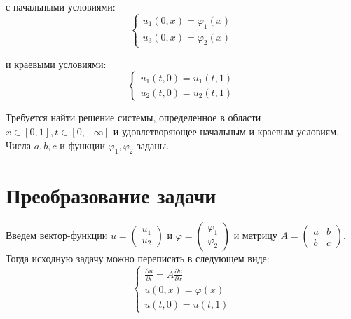 \documentclass[titlepage]{article}
\def\l{\left}
\def\r{\right}
\def\part{\partial}
\begin{document}
с начальными условиями:
\begin{equation*}
 \begin{cases}
 	u_1(0,x) = \varphi_1(x)
   \\
 	u_3(0,x) = \varphi_2(x)	
 \end{cases}
\end{equation*}

и краевыми условиями:
\begin{equation*}
 \begin{cases}
 	u_1(t,0) = u_1(t,1)
   \\
 	u_2(t,0) = u_2(t,1)
 \end{cases}
\end{equation*}

Требуется найти решение системы, определенное в области $x \in [0,1], t \in [0,+\infty]$ и удовлетворяющее начальным и краевым условиям.
Числа $a, b, c$ и функции $\varphi_1, \varphi_2$ заданы.

\section{Преобразование задачи}
Введем вектор-функции $u = \l(\begin{matrix} u_1 \\ u_2 \end{matrix}\r)$ и $\varphi = \l(\begin{matrix} \varphi_1 \\ \varphi_2 \end{matrix}\r)$ и матрицу $A = \l(\begin{matrix}a & b\\ b & c\end{matrix}\r)$. Тогда исходную задачу можно переписать в следующем виде:
\begin{equation*}
 \begin{cases}
 	\frac{\part u}{\part t} = A\frac{\part u}{\part x}
 	\\
	u(0,x) = \varphi(x)
	\\	
	u(t, 0) = u(t, 1)
 \end{cases}
\end{equation*}
\end{document}
